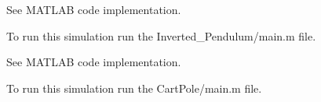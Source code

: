 \documentclass[11pt]{homework}
\begin{document}
\maketitle

\renewcommand{\questiontype}{Part}
\question
	See MATLAB code implementation. 

	To run this simulation run the Inverted\_Pendulum/main.m file.

\renewcommand{\questiontype}{Part}
\question
	See MATLAB code implementation. 

	To run this simulation run the CartPole/main.m file.
	
\setcounter{questionCounter}{2}
\renewcommand{\questiontype}{Part}
\question
\end{document}
